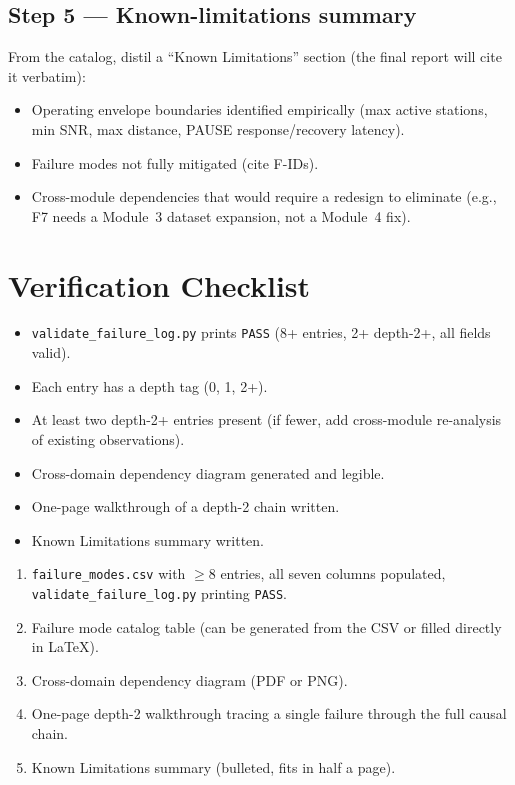 \documentclass[11pt,letterpaper]{article}
\begin{document}
\subsection{Step 5 --- Known-limitations summary}
From the catalog, distil a ``Known Limitations'' section (the final report will cite it verbatim):

\begin{itemize}[leftmargin=2em]
	\item Operating envelope boundaries identified empirically (max active stations, min \mbox{SNR}, max distance, PAUSE response/recovery latency).
	\item Failure modes not fully mitigated (cite F-IDs).
	\item Cross-module dependencies that would require a redesign to eliminate (e.g., F7 needs a Module~3 dataset expansion, not a Module~4 fix).
\end{itemize}

\section{Verification Checklist}
\begin{itemize}[leftmargin=2em]
	\item[$\square$] \texttt{validate\_failure\_log.py} prints \texttt{PASS} (8+ entries, 2+ depth-2+, all fields valid).
	\item[$\square$] Each entry has a depth tag (0, 1, 2+).
	\item[$\square$] At least two depth-2+ entries present (if fewer, add cross-module re-analysis of existing observations).
	\item[$\square$] Cross-domain dependency diagram generated and legible.
	\item[$\square$] One-page walkthrough of a depth-2 chain written.
	\item[$\square$] Known Limitations summary written.
\end{itemize}

\begin{tcolorbox}[deliverable={Lab Handout 5-E Deliverable}]
	\begin{enumerate}[leftmargin=1.2em]
		\item \texttt{failure\_modes.csv} with $\geq$8 entries, all seven columns populated, \texttt{validate\_failure\_log.py} printing \texttt{PASS}.
		\item Failure mode catalog table (can be generated from the CSV or filled directly in LaTeX).
		\item Cross-domain dependency diagram (PDF or PNG).
		\item One-page depth-2 walkthrough tracing a single failure through the full causal chain.
		\item Known Limitations summary (bulleted, fits in half a page).
	\end{enumerate}
\end{tcolorbox}

\printhandoutglossary
\end{document}
